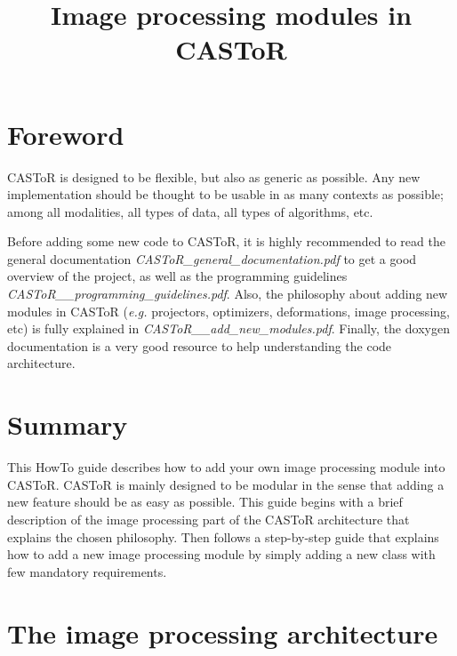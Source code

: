 \documentclass[a4paper, 11pt]{article}
\begin{document}
\title{Image processing modules in CASToR}
\maketitle

\section*{Foreword}

CASToR is designed to be flexible, but also as generic as possible.
Any new implementation should be thought to be usable in as many contexts as possible; among all modalities, all types of data, all types of algorithms, etc.

Before adding some new code to CASToR, it is highly recommended to read the general documentation \textit{CASToR\_general\_documentation.pdf} to get a good overview of the project, as well as the programming guidelines \textit{CASToR\_\_programming\_guidelines.pdf}.
Also, the philosophy about adding new modules in CASToR (\textit{e.g.} projectors, optimizers, deformations, image processing, etc) is fully explained in \textit{CASToR\_\_add\_new\_modules.pdf}.
Finally, the doxygen documentation is a very good resource to help understanding the code architecture.

\section{Summary}

This HowTo guide describes how to add your own image processing module into CASToR. CASToR is mainly designed to be modular in the sense that adding a new feature
should be as easy as possible. This guide begins with a brief description of the image processing part of the CASToR architecture that explains the chosen philosophy.
Then follows a step-by-step guide that explains how to add a new image processing module by simply adding a new class with few mandatory requirements.

\section{The image processing architecture}
\end{document}
